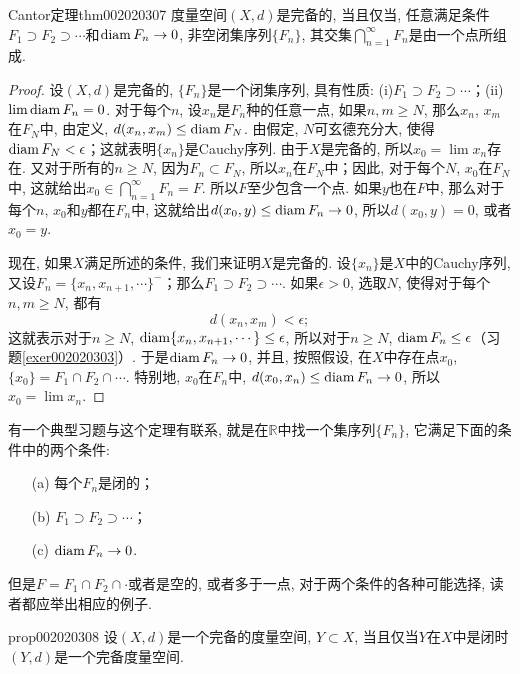 \begin{theorem}{Cantor定理}{thm002020307}
度量空间$(X, d)$是完备的, 当且仅当, 任意满足条件$F_1 \supset F_2 \supset \cdots$和$\operatorname{diam}{F_n} \to 0$, 非空闭集序列$\{F_n\}$, 其交集$\bigcap_{n=1}^{\infty}{F_n}$是由一个点所组成. 
\end{theorem}

\begin{proof}
设$(X, d)$是完备的, $\{F_n\}$是一个闭集序列, 具有性质: (i)$F_1 \supset F_2 \supset \cdots$；(ii)$\lim{\operatorname{diam}{F_n}} = 0$. 对于每个$n$, 设$x_n$是$F_n$种的任意一点, 如果$n, m \ge N$, 那么$x_n$, $x_m$在$F_N$中, 由定义, $d(x_n, x_m) \le \operatorname{diam}{F_N}$. 由假定, $N$可玄德充分大, 使得$\operatorname{diam}{F_N} < \epsilon$；这就表明$\{x_n\}$是Cauchy序列. 由于$X$是完备的, 所以$x_0 = \lim{x_n}$存在. 又对于所有的$n \ge N$, 因为$F_n \subset F_N$, 所以$x_n$在$F_N$中；因此, 对于每个$N$, $x_0$在$F_N$中, 这就给出$x_0 \in \bigcap_{n=1}^{\infty}{F_n} =F$. 所以$F$至少包含一个点. 如果$y$也在$F$中, 那么对于每个$n$, $x_0$和$y$都在$F_n$中, 这就给出$d(x_0, y) \le \operatorname{diam}{F_n} \to 0$, 所以$d(x_0, y) = 0$, 或者$x_0 = y$. 

现在, 如果$X$满足所述的条件, 我们来证明$X$是完备的. 设$\{x_n\}$是$X$中的Cauchy序列, 又设$F_n = \{x_n, x_{n+1},\cdots\}^-$；那么$F_1 \supset F_2 \supset \cdots$. 如果$\epsilon > 0$, 选取$N$, 使得对于每个$n, m \ge N$, 都有
\[
d(x_n, x_m) < \epsilon;
\]
这就表示对于$n \ge N$, $\operatorname{diam}\{x_n, x_{n+1}, \cdots\} \le \epsilon$, 所以对于$n \ge N$, $\operatorname{diam}{F_n} \le \epsilon$（习题\ref{exer002020303}）. 于是$\operatorname{diam}{F_n} \to 0$, 并且, 按照假设, 在$X$中存在点$x_0$, $\{x_0\} = F_1 \cap F_2 \cap \cdots$. 特别地, $x_0$在$F_n$中, $d(x_0, x_n) \le \operatorname{diam}{F_n} \to 0$, 所以$x_0 = \lim{x_n}$. 
\end{proof}

有一个典型习题与这个定理有联系, 就是在$\mathbb{R}$中找一个集序列$\{F_n\}$, 它满足下面的条件中的两个条件: 
\begin{enumerate}
\item[(a)]每个$F_n$是闭的；
\item[(b)]$F_1 \supset F_2 \supset \cdots$；
\item[(c)]$\operatorname{diam}{F_n} \to 0$. 
\end{enumerate}
但是$F = F_1 \cap F_2 \cap \cdot$或者是空的, 或者多于一点, 对于两个条件的各种可能选择, 读者都应举出相应的例子. 

\begin{proposition}{}{prop002020308}
设$(X, d)$是一个完备的度量空间, $Y \subset X$, 当且仅当$Y$在$X$中是闭时$(Y, d)$是一个完备度量空间. 
\end{proposition}

